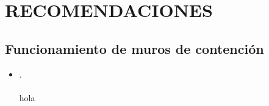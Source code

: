 \chapter[\hspace{0.2cm}RECOMENDACIONES]{RECOMENDACIONES}
\thispagestyle{empty}
\section{Funcionamiento de muros de contención}
\begin{itemize}[leftmargin=1em]
    \item \lipsum[1]
    
    \parencite{Niu2020}. \\
    \parencite[see][p10]{Niu2020} \\
     hola \\
    \textcite{Niu2020}
\end{itemize}



